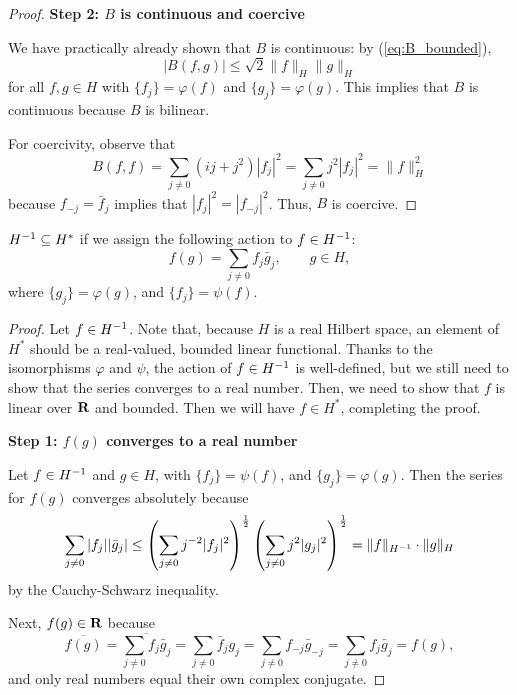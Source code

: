 \documentclass{homework}
\begin{document}
\begin{arabicparts}
\begin{proof}
			\textbf{Step 2: $B$ is continuous and coercive}
			
			We have practically already shown that $B$ is continuous: by (\ref{eq:B_bounded}),
			\begin{equation}
				|B(f,g)| \le \sqrt{2}\lVert f\rVert_H\lVert g\rVert_H
			\end{equation}
			for all $f,g\in H$ with $\{f_j\} = \varphi(f)$ and $\{g_j\} = \varphi(g)$. This implies that $B$ is continuous because $B$ is bilinear.
			
			For coercivity, observe that
			\begin{equation}
				B(f,f) = \sum_{j\ne0}(ij+j^2)|f_j|^2 = \sum_{j\ne0}j^2|f_j|^2 = \lVert f \rVert_H^2
			\end{equation}
			because $f_{-j} = \bar{f}_j$ implies that $|f_j|^2 = |f_{-j}|^2$. Thus, $B$ is coercive.
		\end{proof}
		
		\questionpart
		${H^{-1}} \subseteq H^*$ if we assign the following action to $f \in {H^{-1}}$:
		\begin{equation}
			f(g) = \sum_{j\ne0}f_j\bar{g}_j, \qquad g\in H,
		\end{equation}
		where $\{g_j\}=\varphi(g)$, and $\{f_j\} = \psi(f)$.
		
		\begin{proof}
			Let $f\in {H^{-1}}$. Note that, because $H$ is a real Hilbert space, an element of $H^*$ should be a real-valued, bounded linear functional. Thanks to the isomorphisms $\varphi$ and $\psi$, the action of $f \in {H^{-1}}$ is well-defined, but we still need to show that the series converges to a real number. Then, we need to show that $f$ is linear over $\textnormal{\bf R}$ and bounded. Then we will have $f \in H^*$, completing the proof.
			
			\textbf{Step 1: $f(g)$ converges to a real number}
			
			Let $f \in {H^{-1}}$ and $g\in H$, with $\{f_j\} = \psi(f)$, and $\{g_j\} = \varphi(g)$. Then the series for $f(g)$ converges absolutely because
			\begin{equation}
				\label{eq:f_bounded}
				\sum_{j\ne0}|f_j||\bar{g}_j| \le \left(\sum_{j\ne0}j^{-2}|f_j|^2\right)^\frac{1}{2}\left(\sum_{j\ne0}j^2|g_j|^2\right)^\frac{1}{2} = \lVert f\rVert_{H^{-1}}\cdot\lVert g\rVert_H
			\end{equation}
			by the Cauchy-Schwarz inequality.
			
			Next, $f(g) \in \textnormal{\bf R}$ because
			\begin{equation}
				\overline{f(g)}=\overline{\sum_{j\ne0}f_j\bar{g}_j} = \sum_{j\ne0}\bar{f}_jg_j = \sum_{j\ne0}f_{-j}\bar{g}_{-j} = \sum_{j\ne0}f_j\bar{g}_j = f(g),
			\end{equation}
			and only real numbers equal their own complex conjugate.
			

\end{proof}
\end{arabicparts}
\end{document}
